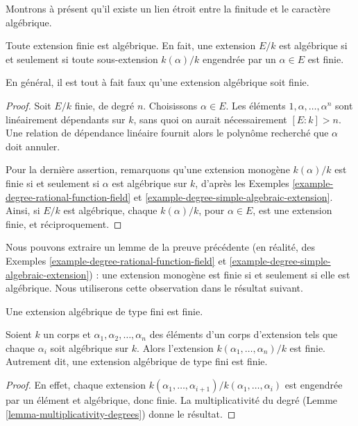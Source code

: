 \noindent
Montrons à présent qu'il existe un lien étroit entre la finitude et le caractère
algébrique.

\begin{lemma}
\label{lemma-finite-is-algebraic}
Toute extension finie est algébrique. En fait, une extension $E/k$ est algébrique
si et seulement si toute sous-extension $k(\alpha)/k$ engendrée par un
$\alpha \in E$ est finie.
\end{lemma}

\noindent
En général, il est tout à fait faux qu'une extension algébrique soit finie.

\begin{proof}
Soit $E/k$ finie, de degré $n$. Choisissons $\alpha \in E$. Les
éléments $1, \alpha, \ldots, \alpha^n$ sont linéairement
dépendants sur $k$, sans quoi on aurait nécessairement $[E : k] > n$. Une relation de
dépendance linéaire fournit alors le polynôme recherché que $\alpha$ doit annuler.

\medskip\noindent
Pour la dernière assertion, remarquons qu'une extension monogène $k(\alpha)/k$ est
finie si et seulement si $\alpha$ est algébrique sur $k$, d'après les
Exemples \ref{example-degree-rational-function-field} et
\ref{example-degree-simple-algebraic-extension}.
Ainsi, si $E/k$ est algébrique, chaque $k(\alpha)/k$, pour $\alpha \in E$, est une extension
finie, et réciproquement.
\end{proof}

\noindent
Nous pouvons extraire un lemme de la preuve précédente (en réalité, des
Exemples \ref{example-degree-rational-function-field} et
\ref{example-degree-simple-algebraic-extension}) :
une extension monogène est finie si et seulement si elle est algébrique.
Nous utiliserons cette observation dans le résultat suivant.

\begin{lemma}
\label{lemma-algebraic-finitely-generated}
\begin{slogan}
Une extension algébrique de type fini est finie.
\end{slogan}
Soient $k$ un corps et $\alpha_1, \alpha_2, \ldots, \alpha_n$ des éléments
d'un corps d'extension tels que chaque $\alpha_i$ soit algébrique sur $k$. Alors
l'extension $k(\alpha_1, \ldots, \alpha_n)/k$ est finie.
Autrement dit, une extension algébrique de type fini est finie.
\end{lemma}

\begin{proof}
En effet, chaque extension
$k(\alpha_{1}, \ldots, \alpha_{i+1})/k(\alpha_1, \ldots, \alpha_{i})$
est engendrée par un élément et algébrique, donc finie.
La multiplicativité du degré (Lemme \ref{lemma-multiplicativity-degrees})
donne le résultat.
\end{proof}


